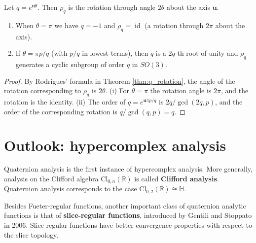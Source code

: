 \begin{corollary}\label{cor:q_rotation_period}
Let $q=e^{\mathbf{u}\theta}$. Then $\rho_q$ is the rotation through angle $2\theta$ about the axis $\mathbf{u}$.
\begin{enumerate}[label=(\roman*)]
    \item When $\theta=\pi$ we have $q=-1$ and $\rho_q=\operatorname{id}$ (a rotation through $2\pi$ about the axis).
    \item If $\theta=\pi p/q$ (with $p/q$ in lowest terms), then $q$ is a $2q$-th root of unity and $\rho_q$ generates a cyclic subgroup of order $q$ in $SO(3)$.
\end{enumerate}
\end{corollary}

\begin{proof}
By Rodrigues' formula in Theorem \ref{thm:q_rotation}, the angle of the rotation corresponding to $\rho_q$ is $2\theta$. (i) For $\theta=\pi$ the rotation angle is $2\pi$, and the rotation is the identity. (ii) The order of $q=e^{\mathbf{u}\pi p/q}$ is $2q/\gcd(2q,p)$, and the order of the corresponding rotation is $q/\gcd(q,p)=q$.
\end{proof}

\section{Outlook: hypercomplex analysis}

\begin{remark}\label{rem:q_clifford}
Quaternion analysis is the first instance of hypercomplex analysis. More generally, analysis on the Clifford algebra $\mathrm{Cl}_{0,n}(\mathbb{R})$ is called \textbf{Clifford analysis}. Quaternion analysis corresponds to the case $\mathrm{Cl}_{0,2}(\mathbb{R})\cong\mathbb{H}$.
\end{remark}

\begin{remark}\label{rem:q_slice_regular}
Besides Fueter-regular functions, another important class of quaternion analytic functions is that of \textbf{slice-regular functions}, introduced by Gentili and Stoppato in 2006. Slice-regular functions have better convergence properties with respect to the slice topology.
\end{remark}

